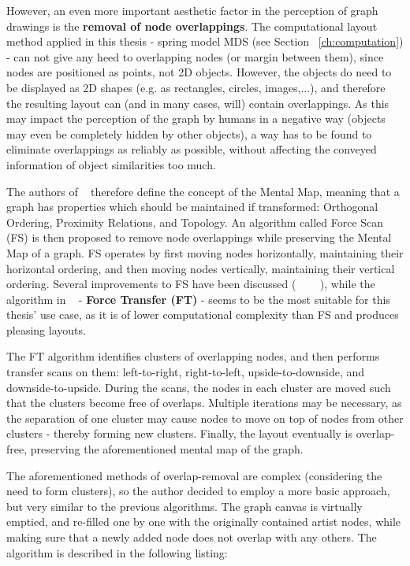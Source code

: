 However, an even more important aesthetic factor in the perception of graph drawings is the \textbf{removal of node overlappings}. The computational layout method applied in this thesis - spring model MDS (see Section ~\ref{ch:computation}) - can not give any heed to overlapping nodes (or margin between them), since nodes are positioned as points, not 2D objects. However, the objects do need to be displayed as 2D shapes (e.g. as rectangles, circles, images,...), and therefore the resulting layout can (and in many cases, will) contain overlappings.
As this may impact the perception of the graph by humans in a negative way (objects may even be completely hidden by other objects), a way has to be found to eliminate overlappings as reliably as possible, without affecting the conveyed information of object similarities too much.

The authors of ~\cite{journals/vlc/MisueELS95} therefore define the concept of the Mental Map, meaning that a graph has properties which should be maintained if transformed: Orthogonal Ordering, Proximity Relations, and Topology. An algorithm called Force Scan (FS) is then proposed to remove node overlappings while preserving the Mental Map of a graph. FS operates by first moving nodes horizontally, maintaining their horizontal ordering, and then moving nodes vertically, maintaining their vertical ordering. Several improvements to FS have been discussed (~\cite{Hayashi:1998:LAP:647550.728930} ~\cite{Huang03force-transfer:a} ~\cite{Li:2005}), while the algorithm in ~\cite{Huang03force-transfer:a} - \textbf{Force Transfer (FT)} - seems to be the most suitable for this thesis' use case, as it is of lower computational complexity than FS and produces pleasing layouts.

The FT algorithm identifies clusters of overlapping nodes, and then performs transfer scans on them: left-to-right, right-to-left, upside-to-downside, and downside-to-upside. During the scans, the nodes in each cluster are moved such that the clusters become free of overlaps. Multiple iterations may be necessary, as the separation of one cluster may cause nodes to move on top of nodes from other clusters - thereby forming new clusters. Finally, the layout eventually is overlap-free, preserving the aforementioned mental map of the graph.

The aforementioned methods of overlap-removal are complex (considering the need to form clusters), so the author decided to employ a more basic approach, but very similar to the previous algorithms. The graph canvas is virtually emptied, and re-filled one by one with the originally contained artist nodes, while making sure that a newly added node does not overlap with any others. The algorithm is described in the following listing:

